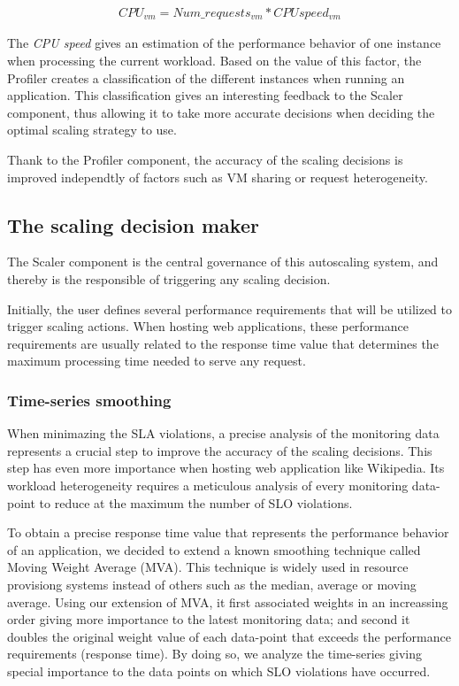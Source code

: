 \begin{enumerate}
\begin{equation}\label{cpu_speed}
\begin{split}
CPU_{vm} = Num\_requests_{vm} * CPU speed_{vm}
\end{split}
\end{equation}


The \emph{CPU speed} gives an estimation of the performance behavior of one instance when processing the current workload. Based on the value of this factor, the Profiler creates a classification of the different instances when running an application. This classification gives an interesting feedback to the Scaler component, thus allowing it to take more accurate decisions when deciding the optimal scaling strategy to use.

\end{enumerate}

Thank to the Profiler component, the accuracy of the scaling decisions is improved independtly of factors such as VM sharing or request heterogeneity.


\subsection{The scaling decision maker}

The Scaler component is the central governance of this autoscaling system, and thereby is the responsible of triggering any scaling decision.


Initially, the user defines several performance requirements that will be utilized to trigger scaling actions. When hosting web applications, these performance requirements are usually related to the response time value that determines the maximum processing time needed to serve any request.


\subsubsection{Time-series smoothing}

When minimazing the SLA violations, a precise analysis of the monitoring data represents a crucial step to improve the accuracy of the scaling decisions. This step has even more importance when hosting web application like Wikipedia. Its workload heterogeneity requires a meticulous analysis of every monitoring data-point to reduce at the maximum the number of SLO violations. 

To obtain a precise response time value that represents the performance behavior of an application, we decided to extend a known smoothing technique called Moving Weight Average (MVA). This technique is widely used in resource provisiong systems instead of others such as the median, average or moving average. Using our extension of MVA, it first associated weights in an increassing order giving more importance to the latest monitoring data; and second it doubles the original weight value of each data-point that exceeds the performance requirements (response time). By doing so, we analyze the time-series giving special importance to the data points on which SLO violations have occurred.

